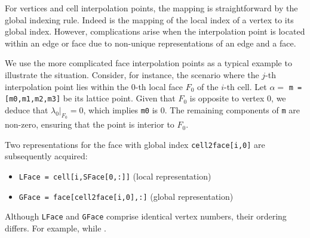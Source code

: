 \documentclass[mathpazo]{cicp}
\begin{document}
For vertices and cell interpolation points, the mapping is straightforward by
the global indexing rule. Indeed  is the mapping of the local index of a vertex to its global index. 
However, complications arise when the
interpolation point is located within an edge or face due to non-unique representations of an edge and a face. 

We use the more complicated face interpolation points as a typical example to illustrate the situation. 
Consider, for instance, the scenario where the $j$-th interpolation point lies
within the $0$-th local face \(F_0\) of the $i$-th cell. Let \(\alpha = \)
\lstinline{m = [m0,m1,m2,m3]} be its lattice point. Given that \(F_0\) is
opposite to vertex $0$, we deduce that \(\lambda_0|_{F_0} = 0\), which implies
\lstinline{m0} is $0$. The remaining components of \lstinline{m} are non-zero,
ensuring that the point is interior to \(F_0\). 


Two representations for the face with global index \lstinline{cell2face[i,0]} are subsequently acquired:
\begin{itemize}
  \item \lstinline{LFace = cell[i,SFace[0,:]]} (local representation)
  \item \lstinline{GFace = face[cell2face[i,0],:]} (global representation)
\end{itemize}
Although \lstinline{LFace} and \lstinline{GFace} comprise identical vertex
numbers, their ordering differs. For example,  while . 
\end{document}
